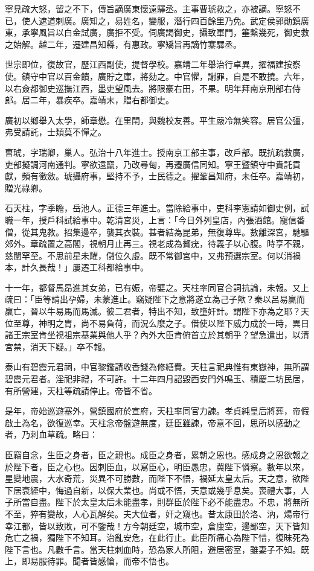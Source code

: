 \begin{pinyinscope}
寧見疏大怒，留之不下，傳旨謫廣東懷遠驛丞。主事曹琥救之，亦被謫。寧怒不已，使人遮道刺廣。廣知之，易姓名，變服，潛行四百餘里乃免。武定侯郭勛鎮廣東，承寧風旨以白金試廣，廣拒不受。伺廣謁御史，攝致軍門，箠繫幾死，御史救之始解。越二年，遷建昌知縣，有惠政。寧矯旨再謫竹寨驛丞。

世宗即位，復故官，歷江西副使，提督學校。嘉靖二年舉治行卓異，擢福建按察使。鎮守中官以百金饋，廣貯之庫，將劾之。中官懼，謝罪，自是不敢撓。六年，以右僉都御史巡撫江西，墨吏望風去。將限豪右田，不果。明年拜南京刑部右侍郎。居二年，暴疾卒。嘉靖末，贈右都御史。

廣初以鄉舉入太學，師章懋。在里閈，與魏校友善。平生嚴冷無笑容。居官公彊，弗受請託，士類莫不憚之。

曹琥，字瑞卿，巢人。弘治十八年進士。授南京工部主事，改戶部。既抗疏救廣，吏部擬調河南通判。寧欲遠竄，乃改尋甸，再遷廣信同知。寧王暨鎮守中貴託貢獻，頻有徵斂。琥攝府事，堅持不予，士民德之。擢鞏昌知府，未任卒。嘉靖初，贈光祿卿。

石天柱，字季瞻，岳池人。正德三年進士。當除給事中，吏科李憲請如御史例，試職一年，授戶科試給事中。乾清宮災，上言：「今日外列皇店，內張酒館。寵信番僧，從其鬼教。招集邊卒，襲其衣裝。甚者結為昆弟，無復尊卑。數離深宮，馳驅郊外。章疏置之高閣，視朝月止再三。視老成為贅疣，待義子以心腹。時享不親，慈闈罕至。不思前星未耀，儲位久虛。既不常御宮中，又弗預選宗室。何以消禍本，計久長哉！」屢遷工科都給事中。

十一年，都督馬昂進其女弟，已有娠，帝嬖之。天柱率同官合詞抗論，未報。又上疏曰：「臣等請出孕婦，未蒙進止。竊疑陛下之意將遂立為己子歟？秦以呂易羸而羸亡，晉以牛易馬而馬滅。彼二君者，特出不知，致墮奸計。謂陛下亦為之耶？天位至尊，神明之胄，尚不易負荷，而況么麼之子。借使以陛下威力成於一時，異日諸王宗室肯坐視祖宗基業與他人乎？內外大臣肯俯首立於其朝乎？望急遣出，以清宮禁，消天下疑。」卒不報。

泰山有碧霞元君祠，中官黎鑑請收香錢為修繕費。天柱言祀典惟有東嶽神，無所謂碧霞元君者。淫祀非禮，不可許。十二年四月詔毀西安門外鳴玉、積慶二坊民居，有所營建，天柱等疏請停止。帝皆不省。

是年，帝始巡遊塞外，營鎮國府於宣府，天柱率同官力諫。孝貞純皇后將葬，帝假啟土為名，欲復巡幸。天柱念帝盤遊無度，廷臣雖諫，帝意不回，思所以感動之者，乃刺血草疏。略曰：

臣竊自念，生臣之身者，臣之親也。成臣之身者，累朝之恩也。感成身之恩欲報之於陛下者，臣之心也。因刺臣血，以寫臣心，明臣愚忠，冀陛下憐察。數年以來，星變地震，大水奇荒，災異不可勝數，而陛下不悟，禍延太皇太后。天之意，欲陛下居衰絰中，悔過自新，以保大業也。尚或不悟，天意或幾乎息矣。喪禮大事，人子所當自盡。陛下於太皇太后未能盡孝，則群臣於陛下必不能盡忠。不忠，將無所不至，猝有變故，人心瓦解矣。夫大位者，奸之窺也。昔太康田於洛、汭，煬帝行幸江都，皆以致敗，可不鑒哉！方今朝廷空，城市空，倉廩空，邊鄙空，天下皆知危亡之禍，獨陛下不知耳。治亂安危，在此行止。此臣所痛心為陛下惜，復昧死為陛下言也。凡數千言。當天柱刺血時，恐為家人所阻，避居密室，雖妻子不知。既上，即易服待罪。聞者皆感愴，而帝不悟也。


\end{pinyinscope}
